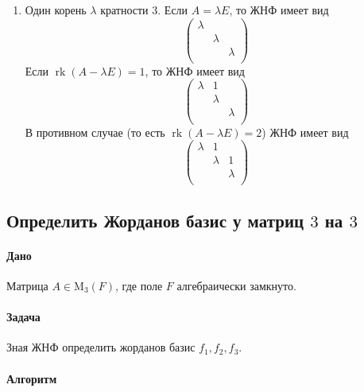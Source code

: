 \documentclass{article}
\newcommand{\Matrix}[2]{\operatorname{\mathrm{M}_{#2}}(#1)}
\newcommand{\rk}{\operatorname{rk}}
\begin{document}
\begin{enumerate}
\item Один корень $\lambda$ кратности $3$.
Если $A = \lambda E$, то ЖНФ имеет вид
\[
\begin{pmatrix}
{\lambda}&{}&{}\\
{}&{\lambda}&{}\\
{}&{}&{\lambda}\\
\end{pmatrix}
\]
Если $\rk(A-\lambda E) = 1$, то ЖНФ имеет вид
\[
\begin{pmatrix}
{\lambda}&{1}&{}\\
{}&{\lambda}&{}\\
{}&{}&{\lambda}\\
\end{pmatrix}
\]
В противном случае (то есть $\rk(A - \lambda E) = 2$) ЖНФ имеет вид
\[
\begin{pmatrix}
{\lambda}&{1}&{}\\
{}&{\lambda}&{1}\\
{}&{}&{\lambda}\\
\end{pmatrix}
\]
\end{enumerate}

\subsection{Определить Жорданов базис у матриц $3$ на $3$}

\paragraph{Дано}

Матрица $A \in \Matrix{F}{3}$, где поле $F$ алгебраически замкнуто.

\paragraph{Задача}

Зная ЖНФ определить жорданов базис $f_1, f_2, f_3$.

\paragraph{Алгоритм}
\end{document}
